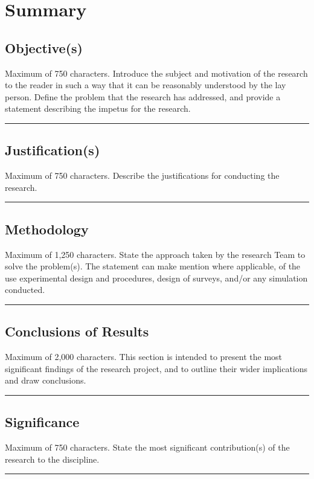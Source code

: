 
\setcounter{chapter}{-1}
\chapter{Summary}\label{chp:summary}

\section{Objective(s)}
Maximum of 750 characters. Introduce the subject and motivation of the research to the reader in such a way that it can be reasonably understood by the lay person. Define the problem that the research has addressed, and provide a statement describing the impetus for the research.
\\\hrule

\section{Justification(s)}
Maximum of 750 characters. Describe the justifications for conducting the research.
\\\hrule

\section{Methodology}
Maximum of 1,250 characters. State the approach taken by the research Team to solve the problem(s). The statement can make mention where applicable, of the use experimental design and procedures, design of surveys, and/or any simulation conducted.
\\\hrule

\section{Conclusions of Results}
Maximum of 2,000 characters. This section is intended to present the most significant findings of the research project, and to outline their wider implications and draw conclusions.
\\\hrule

\section{Significance}
Maximum of 750 characters. State the most significant contribution(s) of the research to the discipline.
\\\hrule

